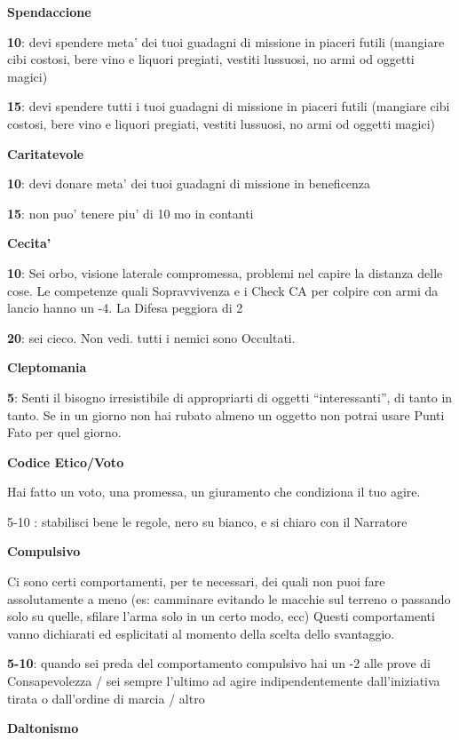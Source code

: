 \documentclass[a4paper,11pt,twoside,openany]{dndbook}
\begin{document}
{\textbf{Spendaccione}

\textbf{10}: devi spendere meta' dei tuoi guadagni di missione in piaceri futili (mangiare cibi costosi, bere vino e liquori pregiati, vestiti lussuosi, no armi od oggetti magici)

\textbf{15}: devi spendere tutti i tuoi guadagni di missione in piaceri futili (mangiare cibi costosi, bere vino e liquori pregiati, vestiti lussuosi, no armi od oggetti magici)

\textbf{Caritatevole}

\textbf{10}: devi donare meta' dei tuoi guadagni di missione in beneficenza

\textbf{15}: non puo' tenere piu' di 10 mo in contanti

\textbf{Cecita'}

\textbf{10}: Sei orbo, visione laterale compromessa, problemi nel capire la distanza delle cose.
Le competenze quali Sopravvivenza e i Check CA per colpire con armi da lancio hanno
un -4. La Difesa peggiora di 2

\textbf{20}: sei cieco. Non vedi. tutti i nemici sono Occultati.

\textbf{Cleptomania}

\textbf{5}: Senti il bisogno irresistibile di appropriarti di oggetti “interessanti”, di tanto in tanto. Se in un giorno non hai rubato almeno un oggetto non potrai usare Punti Fato per quel giorno.

\textbf{Codice Etico/Voto}

Hai fatto un voto, una promessa, un giuramento che condiziona il tuo agire.

5-10 : stabilisci bene le regole, nero su bianco, e si chiaro con il Narratore

\textbf{Compulsivo}

Ci sono certi comportamenti, per te necessari, dei quali non puoi fare assolutamente a meno (es: camminare evitando le macchie sul terreno o passando solo su quelle, sfilare l'arma solo in un certo modo, ecc) 
Questi comportamenti vanno dichiarati ed esplicitati al momento della scelta dello svantaggio.

\textbf{5-10}: quando sei preda del comportamento compulsivo hai un -2 alle prove di Consapevolezza / sei sempre l'ultimo ad agire indipendentemente dall'iniziativa tirata o dall'ordine di marcia / altro

\textbf{Daltonismo}

}
\end{document}

